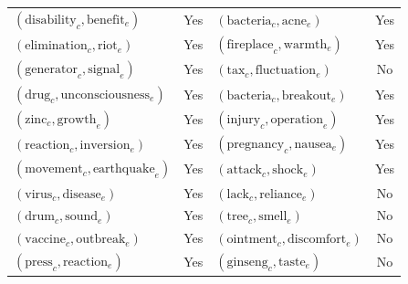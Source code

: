 \documentclass[letterpaper]{article}
\begin{document}
\begin{table}[bht]
\begin{tabular}{| l c | l c |}
$(\text{disability}_c, \text{benefit}_e)$ & Yes & $(\text{bacteria}_c, \text{acne}_e)$ & Yes \\
$(\text{elimination}_c, \text{riot}_e)$ & Yes & $(\text{fireplace}_c, \text{warmth}_e)$ & Yes \\
$(\text{generator}_c, \text{signal}_e)$ & Yes & $(\text{tax}_c, \text{fluctuation}_e)$ & No \\
$(\text{drug}_c, \text{unconsciousness}_e)$ & Yes & $(\text{bacteria}_c, \text{breakout}_e)$ & Yes \\
$(\text{zinc}_c, \text{growth}_e)$ & Yes & $(\text{injury}_c, \text{operation}_e)$ & Yes \\
$(\text{reaction}_c, \text{inversion}_e)$ & Yes & $(\text{pregnancy}_c, \text{nausea}_e)$ & Yes \\
$(\text{movement}_c, \text{earthquake}_e)$ & Yes & $(\text{attack}_c, \text{shock}_e)$ & Yes \\
$(\text{virus}_c, \text{disease}_e)$ & Yes & $(\text{lack}_c, \text{reliance}_e)$ & No \\
$(\text{drum}_c, \text{sound}_e)$ & Yes & $(\text{tree}_c, \text{smell}_e)$ & No \\
$(\text{vaccine}_c, \text{outbreak}_e)$ & Yes & $(\text{ointment}_c, \text{discomfort}_e)$ & No \\
$(\text{press}_c, \text{reaction}_e)$ & Yes & $(\text{ginseng}_c, \text{taste}_e)$ & No \\

\hline
\end{tabular}
\end{table}
\end{document}
